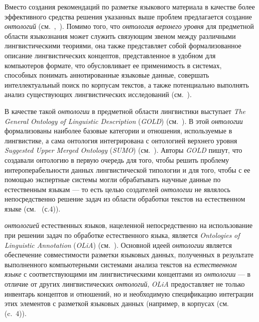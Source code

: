 Вместо создания рекомендаций по разметке языкового материала в качестве более эффективного средства решения указанных выше проблем предлагается создание \textit{онтологий} (см.~,~).
Помимо того, что \textit{онтология верхнего уровня} для предметной области языкознания может служить связующим звеном между различными лингвистическими теориями, она также представляет собой формализованное описание лингвистических концептов, представленное в удобном для компьютеров формате, что обусловливает ее применимость в системах, способных понимать аннотированные языковые данные, совершать интеллектуальный поиск по корпусам текстов, а также потенциально выполнять анализ существующих лингвистических исследований (см.~).

В качестве такой \textit{онтологии} в предметной области лингвистики выступает \textit{The General Ontology of Linguistic Description} (\textit{GOLD}) (см.~).
В этой \textit{онтологии} формализованы наиболее базовые категории и отношения, используемые в лингвистике, а сама онтология интегрирована с онтологией верхнего уровня \textit{Suggested Upper Merged Ontology} (\textit{SUMO}) (см.~).
Авторы \textit{GOLD} пишут, что создавали онтологию в первую очередь для того, чтобы решить проблему интероперабельности данных лингвистической типологии и для того, чтобы с ее помощью экспертные системы могли обрабатывать научные данные по естественным языкам --- то есть целью создателей \textit{онтологии} не являлось непосредственно решение задач из области обработки текстов на естественном языке (см.~ (с.4)).

\textit{онтологией} естественных языков, нацеленной непосредственно на использование при решении задач по обработке естественного языка, является \textit{Ontologies of Linguistic Annotation} (\textit{OLiA}) (см.~).
Основной идеей \textit{онтологии} является обеспечение совместимости разметки языковых данных, полученных в результате выполненного компьютерными системами анализа текстов на \textit{естественном языке} с соответствующими им лингвистическими концептами из \textit{онтологии} --- в отличие от других лингвистических \textit{онтологий}, \textit{OLiA} предоставляет не только инвентарь концептов и отношений, но и необходимую спецификацию интеграции этих элементов с разметкой языковых данных (например, в корпусах (см.~ (c.~4)).

